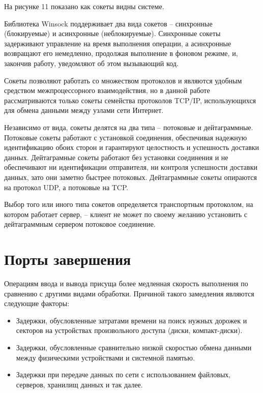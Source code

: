 \documentclass[a4paper, 12pt]{report}		%
\begin{document}
На рисунке 11 показано как сокеты видны системе.

Библиотека Winsock поддерживает два вида сокетов -- синхронные (блокируемые) и асинхронные (неблокируемые). Синхронные сокеты задерживают управление на время выполнения операции, а асинхронные возвращают его немедленно, продолжая выполнение в фоновом режиме, и, закончив работу, уведомляют об этом вызывающий код.

Сокеты позволяют работать со множеством протоколов и являются удобным средством межпроцессорного взаимодействия, но в данной работе рассматриваются только сокеты семейства протоколов TCP/IP, использующихся для обмена данными между узлами сети Интернет.

Независимо от вида, сокеты делятся на два типа -- потоковые и дейтаграммные. Потоковые сокеты работают с установкой соединения, обеспечивая надежную идентификацию обоих сторон и гарантируют целостность и успешность доставки данных. Дейтаграмные сокеты работают без установки соединения и не обеспечивают ни идентификации отправителя, ни контроля успешности доставки данных, зато они заметно быстрее потоковых. Дейтаграммные сокеты опираются на протокол UDP, а потоковые на TCP.

Выбор того или иного типа сокетов определяется транспортным протоколом, на котором работает сервер, -- клиент не может по своему желанию установить с дейтаграммным сервером потоковое соединение.

\chapter*{Порты завершения}

Операциям ввода и вывода присуща более медленная скорость выполнения по сравнению с другими видами обработки. Причиной такого замедления являются следующие факторы:

\begin{itemize}
\item Задержки, обусловленные затратами времени на поиск нужных дорожек и секторов на устройствах произвольного доступа (диски, компакт-диски).

\item Задержки, обусловленные сравнительно низкой скоростью обмена данными между физическими устройствами и системной памятью.

\item Задержки при передаче данных по сети с использованием файловых, серверов, хранилищ данных и так далее.
\end{itemize}
\end{document}
